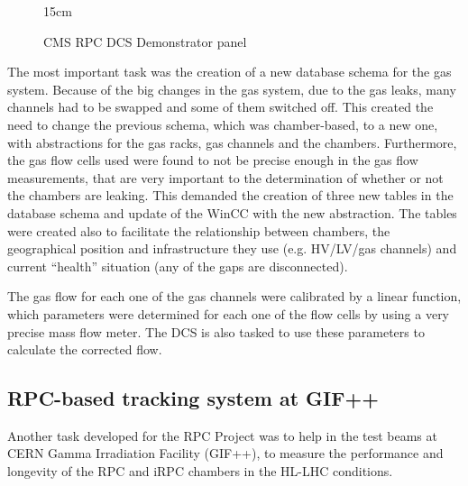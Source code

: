 \begin{figure}[!htm]{15cm} %
\caption{CMS RPC DCS Demonstrator panel}%
\label{fig:RPC_DCS_Demo_panel}
\end{figure}

The most important task was the creation of a new database schema for the gas system. Because of the big changes in the gas system, due to the gas leaks, many channels had to be swapped and some of them switched off. This created the need to change the previous schema, which was chamber-based, to a new one, with abstractions for the gas racks, gas channels and the chambers. Furthermore, the gas flow cells used were found to not be precise enough in the gas flow measurements, that are very important to the determination of whether or not the chambers are leaking. This demanded the creation of three new tables in the database schema and update of the WinCC with the new abstraction. The tables were created also to facilitate the relationship between chambers, the geographical position and infrastructure they use (e.g. HV/LV/gas channels) and current ``health'' situation (any of the gaps are disconnected).

The gas flow for each one of the gas channels were calibrated by a linear function, which parameters were determined for each one of the flow cells by using a very precise mass flow meter. The DCS is also tasked to use these parameters to calculate the corrected flow.

\subsection{RPC-based tracking system at GIF++}

Another task developed for the RPC Project was to help in the test beams at CERN Gamma Irradiation Facility (GIF++), to measure the performance and longevity of the RPC and iRPC chambers in the HL-LHC conditions. 

